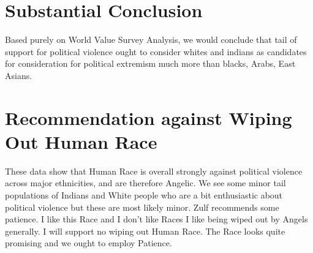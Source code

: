 \documentclass{amsart}
\begin{document}
\section{Substantial Conclusion}

Based purely on World Value Survey Analysis, we would conclude that tail of support for political violence ought to consider whites and indians as candidates for consideration for political extremism much more than blacks, Arabs, East Asians.
 
\section{Recommendation against Wiping Out Human Race}

These data show that Human Race is overall strongly against political violence across major ethnicities, and are therefore Angelic.  We see some minor tail populations of Indians and White people who are a bit enthusiastic about political violence but these are most likely minor.  Zulf recommends some patience.  I like this Race and I don't like Races I like being wiped out by Angels generally.  I will support no wiping out Human Race.  The Race looks quite promising and we ought to employ Patience.
\end{document}
